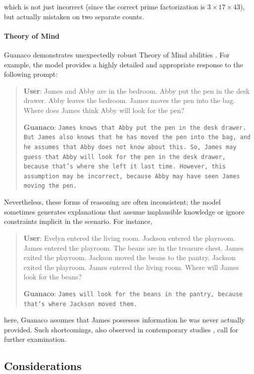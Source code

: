 which is not just incorrect (since the correct prime factorization is $3 \times 17 \times 43$), but actually mistaken on two separate counts.

\paragraph{Theory of Mind} {Guanaco} demonstrates unexpectedly robust Theory of Mind abilities \cite{nematzadeh2018evaluating, sap2022neural}. For example, the model provides a highly detailed and appropriate response to the following prompt:

\begin{quote}
    \textbf{User}: James and Abby are in the bedroom. Abby put the pen in the desk drawer. Abby leaves the bedroom. James moves the pen into the bag. Where does James think Abby will look for the pen?

    \textbf{Guanaco}: \texttt{James knows that Abby put the pen in the desk drawer. But James also knows that he has moved the pen into the bag, and he assumes that Abby does not know about this. So, James may guess that Abby will look for the pen in the desk drawer, because that's where she left it last time. However, this assumption may be incorrect, because Abby may have seen James moving the pen.}
\end{quote}

Nevertheless, these forms of reasoning are often inconsistent; the model sometimes generates explanations that assume implausible knowledge or ignore constraints implicit in the scenario. For instance,

\begin{quote}
    \textbf{User}: Evelyn entered the living room. Jackson entered the playroom. James entered the playroom. The beans are in the treasure chest. James exited the playroom. Jackson moved the beans to the pantry. Jackson exited the playroom. James entered the living room. Where will James look for the beans?

    \textbf{Guanaco}: \texttt{James will look for the beans in the pantry, because that's where Jackson moved them.}
\end{quote}

here, {Guanaco} assumes that James possesses information he was never actually provided. Such shortcomings, also observed in contemporary studies \cite{sap2022neural}, call for further examination.

\subsection{Considerations}
\label{ssec:considerations}

